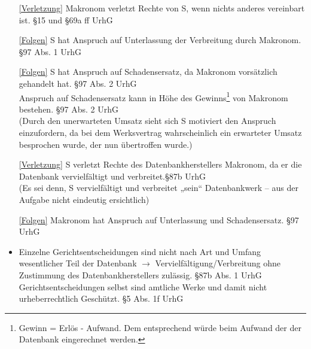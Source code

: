 \documentclass{scrreprt}
\begin{document}
\begin{anumerate}
\item
\begin{itemize}
\item[\ref{Verletzung}] Makronom verletzt Rechte von S, wenn nichts anderes vereinbart ist. \hfill §15 und §69a ff  UrhG
\item[\ref{Folgen}] S hat Anspruch auf Unterlassung der Verbreitung durch Makronom. \hfill §97 Abs. 1 UrhG
\item[\ref{Folgen}] S hat Anspruch auf Schadensersatz, da Makronom vorsätzlich gehandelt hat. \hfill §97 Abs. 2 UrhG\\
Anspruch auf Schadensersatz kann in Höhe des Gewinns\footnote{Gewinn = Erlös - Aufwand. Dem entsprechend würde beim Aufwand der der Datenbank eingerechnet werden.} von Makronom bestehen. \hfill §97 Abs. 2 UrhG\\
(Durch den unerwarteten Umsatz sieht sich S motiviert den Anspruch einzufordern, da bei dem Werksvertrag wahrscheinlich ein erwarteter Umsatz besprochen wurde, der nun übertroffen wurde.)
\end{itemize}
\item
\begin{itemize}
\item[\ref{Verletzung}] S verletzt Rechte des Datenbankherstellers Makronom, da er die Datenbank vervielfältigt und verbreitet.\hfill §87b UrhG\\
(Es sei denn, S vervielfältigt und verbreitet „sein“ Datenbankwerk -- aus der Aufgabe nicht eindeutig ersichtlich)
\item[\ref{Folgen}] Makronom hat Anspruch auf Unterlassung und Schadensersatz. \hfill §97 UrhG
\end{itemize}
\item
\begin{itemize}
\item Einzelne Gerichtsentscheidungen sind nicht nach Art und Umfang wesentlicher Teil der Datenbank $\to$ Vervielfältigung/Verbreitung ohne Zustimmung des Datenbankherstellers zulässig. \hfill §87b Abs. 1 UrhG\\
Gerichtsentscheidungen selbst sind amtliche Werke und damit nicht urheberrechtlich Geschützt. \hfill §5 Abs. 1f UrhG
\end{itemize}
\end{anumerate}
\end{document}
